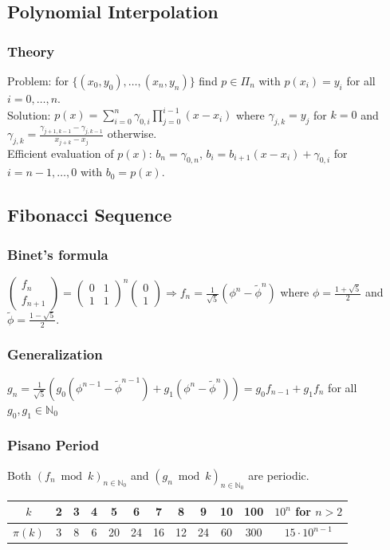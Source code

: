 \documentclass[10pt,a4paper,ngerman,oneside,]{article}
\begin{document}
\begin{multicols}{2}
\subsection{Polynomial Interpolation}
\subsubsection{Theory}
Problem: for $\{(x_0,y_0),\ldots, (x_n, y_n) \}$ find $p \in \Pi_{n}$ with $p(x_i) = y_i$ for all $i=0,\ldots,n$.\\
Solution: $p(x) = \sum\limits_{i=0}^n \gamma_{0,i} \prod\limits_{j=0}^{i-1} (x-x_i)$ where $\gamma_{j,k} = y_j$ for $k = 0$ and $\gamma_{j,k} = \frac { \gamma_{j+1,k-1} - \gamma_{j,k-1} }{x_{j+k}-x_j}$ otherwise. \\
Efficient evaluation of $p(x)$: $b_n = \gamma_{0,n}$, $b_i = b_{i+1}(x-x_i) + \gamma_{0,i}$ for $i=n-1,\ldots,0$ with $b_0 = p(x)$.
\subsection{Fibonacci Sequence}
\subsubsection{Binet's formula}
$
\begin{pmatrix}
f_n \\
f_{n+1}
\end{pmatrix} =
\begin{pmatrix}
0 & 1 \\
1 & 1
\end{pmatrix}^n
\begin{pmatrix}
0 \\
1
\end{pmatrix}
\Rightarrow
f_n = \frac{1}{\sqrt{5}} (\phi^n - \tilde{\phi}^n)$ where $\phi = \frac{1+\sqrt{5}}{2}$ and $\tilde{\phi} = \frac{1-\sqrt{5}}{2}$.
\subsubsection{Generalization}
$g_n = \frac{1}{\sqrt{5}} (g_0 (\phi^{n-1} - \tilde{\phi}^{n-1}) + g_1 (\phi^n - \tilde{\phi}^n)) = g_0 f_{n-1} + g_1 f_n$ for all $g_0, g_1 \in \mathbb{N}_0$

\subsubsection{Pisano Period}
Both $(f_n \bmod k)_{n \in \mathbb{N}_0}$ and $(g_n \bmod k)_{n \in \mathbb{N}_0}$ are periodic.
\begin{table}[htbp]
\begin{tabular}{| c || c | c | c | c | c | c | c | c | c | c | c | }
\hline
$k$ & 2 & 3 & 4 & 5 & 6 & 7 & 8 & 9 & 10 & 100 & $10^n$ for $n >2$ \\
\hline
$\pi(k)$ & 3 & 8 & 6 & 20 & 24 & 16 & 12 & 24 & 60 & 300 & $15 \cdot 10^{n-1}$ \\
\hline
\end{tabular}
\end{table}



\end{multicols}
\end{document}
